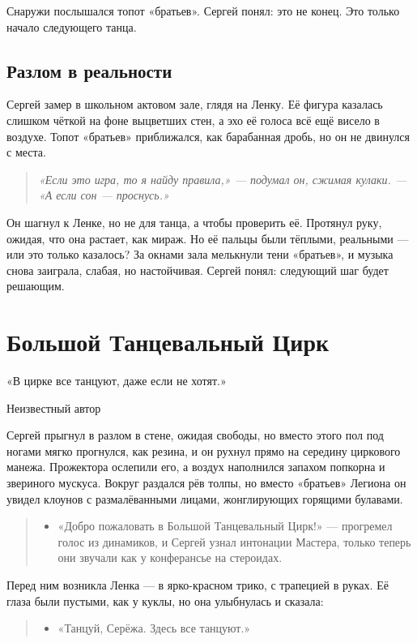 \documentclass[12pt,a4paper]{book}
\newenvironment{dialogue}{\begin{quote}\itshape\begin{itemize}\item[]}{\end{itemize}\end{quote}}
\newenvironment{innerthought}{\begin{quote}\small\itshape}{\end{quote}}
\begin{document}
Снаружи послышался топот «братьев». Сергей понял: это не конец. Это только начало следующего танца.

\section{Разлом в реальности}

Сергей замер в школьном актовом зале, глядя на Ленку. Её фигура казалась слишком чёткой на фоне выцветших стен, а эхо её голоса всё ещё висело в воздухе. Топот «братьев» приближался, как барабанная дробь, но он не двинулся с места.

\begin{innerthought}
«Если это игра, то я найду правила,» --- подумал он, сжимая кулаки. --- «А если сон — проснусь.»
\end{innerthought}

Он шагнул к Ленке, но не для танца, а чтобы проверить её. Протянул руку, ожидая, что она растает, как мираж. Но её пальцы были тёплыми, реальными --- или это только казалось? За окнами зала мелькнули тени «братьев», и музыка снова заиграла, слабая, но настойчивая. Сергей понял: следующий шаг будет решающим.

\chapter{Большой Танцевальный Цирк}
\epigraph{«В цирке все танцуют, даже если не хотят.»}{Неизвестный автор}

Сергей прыгнул в разлом в стене, ожидая свободы, но вместо этого пол под ногами мягко прогнулся, как резина, и он рухнул прямо на середину циркового манежа. Прожектора ослепили его, а воздух наполнился запахом попкорна и звериного мускуса. Вокруг раздался рёв толпы, но вместо «братьев» Легиона он увидел клоунов с размалёванными лицами, жонглирующих горящими булавами.

\begin{dialogue}
«Добро пожаловать в Большой Танцевальный Цирк!» --- прогремел голос из динамиков, и Сергей узнал интонации Мастера, только теперь они звучали как у конферансье на стероидах.
\end{dialogue}

Перед ним возникла Ленка --- в ярко-красном трико, с трапецией в руках. Её глаза были пустыми, как у куклы, но она улыбнулась и сказала:

\begin{dialogue}
«Танцуй, Серёжа. Здесь все танцуют.»
\end{dialogue}
\end{document}
